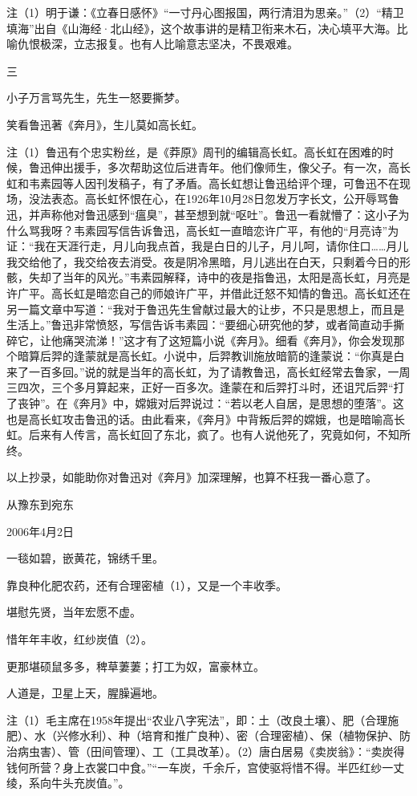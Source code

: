 \documentclass[../../dazhuan.tex]{subfiles}
\begin{document}
注（1）明于谦：《立春日感怀》“一寸丹心图报国，两行清泪为思亲。”（2）“精卫填海”出自《山海经·北山经》，这个故事讲的是精卫衔来木石，决心填平大海。比喻仇恨极深，立志报复。也有人比喻意志坚决，不畏艰难。

三

小子万言骂先生，先生一怒要撕梦。

笑看鲁迅著《奔月》，生儿莫如高长虹。

注（1）鲁迅有个忠实粉丝，是《莽原》周刊的编辑高长虹。高长虹在困难的时候，鲁迅伸出援手，多次帮助这位后进青年。他们像师生，像父子。有一次，高长虹和韦素园等人因刊发稿子，有了矛盾。高长虹想让鲁迅给评个理，可鲁迅不在现场，没法表态。高长虹怀恨在心，在1926年10月28日忽发万字长文，公开辱骂鲁迅，并声称他对鲁迅感到“瘟臭”，甚至想到就“呕吐”。鲁迅一看就懵了：这小子为什么骂我呀？韦素园写信告诉鲁迅，高长虹一直暗恋许广平，有他的“月亮诗”为证：“我在天涯行走，月儿向我点首，我是白日的儿子，月儿呵，请你住口……月儿我交给他了，我交给夜去消受。夜是阴冷黑暗，月儿逃出在白天，只剩着今日的形骸，失却了当年的风光。”韦素园解释，诗中的夜是指鲁迅，太阳是高长虹，月亮是许广平。高长虹是暗恋自己的师娘许广平，并借此迁怒不知情的鲁迅。高长虹还在另一篇文章中写道：“我对于鲁迅先生曾献过最大的让步，不只是思想上，而且是生活上。”鲁迅非常愤怒，写信告诉韦素园：“要细心研究他的梦，或者简直动手撕碎它，让他痛哭流涕！”这才有了这短篇小说《奔月》。细看《奔月》，你会发现那个暗算后羿的逢蒙就是高长虹。小说中，后羿教训施放暗箭的逢蒙说：“你真是白来了一百多回。”说的就是当年的高长虹，为了请教鲁迅，高长虹经常去鲁家，一周三四次，三个多月算起来，正好一百多次。逢蒙在和后羿打斗时，还诅咒后羿“打了丧钟”。在《奔月》中，嫦娥对后羿说过：“若以老人自居，是思想的堕落”。这也是高长虹攻击鲁迅的话。由此看来，《奔月》中背叛后羿的嫦娥，也是暗喻高长虹。后来有人传言，高长虹回了东北，疯了。也有人说他死了，究竟如何，不知所终。

以上抄录，如能助你对鲁迅对《奔月》加深理解，也算不枉我一番心意了。



从豫东到宛东

2006年4月2日

一毯如碧，嵌黄花，锦绣千里。

靠良种化肥农药，还有合理密植（1），又是一个丰收季。

堪慰先贤，当年宏愿不虚。

惜年年丰收，红纱炭值（2）。

更那堪硕鼠多多，稗草萋萋；打工为奴，富豪林立。

人道是，卫星上天，腥臊遍地。

注（1）毛主席在1958年提出“农业八字宪法”，即：土（改良土壤）、肥（合理施肥）、水（兴修水利）、种（培育和推广良种）、密（合理密植）、保（植物保护、防治病虫害）、管（田间管理）、工（工具改革）。（2）唐白居易《卖炭翁》：“卖炭得钱何所营？身上衣裳口中食。”“一车炭，千余斤，宫使驱将惜不得。半匹红纱一丈绫，系向牛头充炭值。”。
\end{document}
